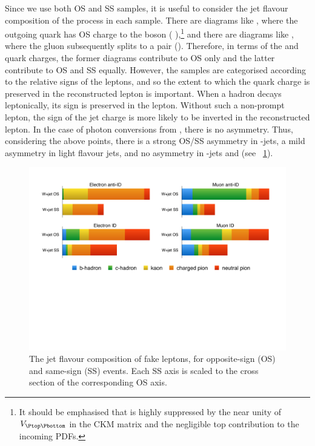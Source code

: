 \clearpage
Since we use both OS and SS samples, it is useful to consider the jet flavour composition of 
the \Wjets process in each sample. There are diagrams like , where the outgoing quark has OS charge to the \PW boson (\eg 
\HepProcess{\PW + \Pcharm}),\footnote{
	It should be emphasised that \HepProcess{\Pquark\Pgluon \HepTo \PW+\Pbottom} is highly 
	suppressed by the near unity of $V_{\Ptop\Pbottom}$	in the CKM matrix and the negligible
	top contribution to the incoming PDFs.
} 
and there are diagrams like , where the gluon subsequently splits to a \HepProcess{\Pquark\APquark} 
pair (\eg \HepProcess{\PW + \Pbottom\APbottom}). Therefore, in terms of the \PW and quark 
charges, the former diagrams contribute to OS only and the latter contribute to OS and 
SS equally. However, the samples are categorised according to the relative signs of the 
leptons, and so the extent to which the quark charge is preserved in the reconstructed 
lepton is important. When a hadron decays leptonically, its sign is preserved in the lepton. 
Without such a non-prompt lepton, the sign of the jet charge is more likely to be inverted 
in the reconstructed lepton. In the case of photon conversions from \HepProcess{\Ppizero 
\HepTo \Pphoton\Pphoton}, there is no asymmetry. Thus, considering the above points, there 
is a strong OS/SS asymmetry in \Pcharm-jets, a mild asymmetry in light flavour jets, and no 
asymmetry in \Pbottom-jets and \HepProcess{\Ppizero \HepTo \Pphoton\Pphoton} (see 
\Figure~\ref{fig:wjets:flav_comp}).

\begin{figure}[t]
	\includegraphics[width=\textwidth,clip=true,trim=1.8cm 12cm 2cm 2cm]{custom_images/wjets/wjets_flavcomp}
	\caption{The jet flavour composition of fake leptons, for opposite-sign (OS) and 
	same-sign (SS) \Wjets events. Each SS axis is scaled to the cross section of the 
	corresponding OS axis.}
	\label{fig:wjets:flav_comp}
\end{figure}

